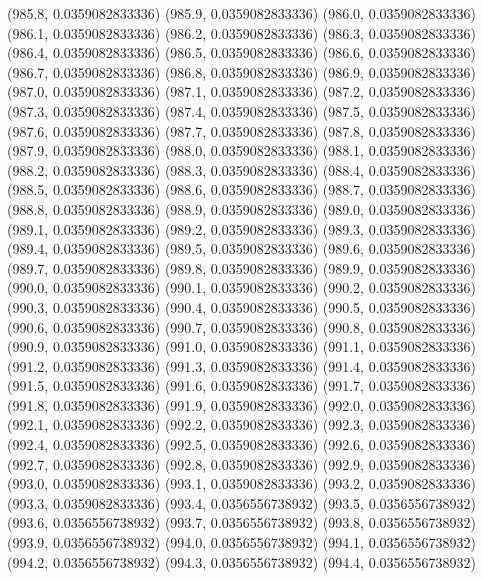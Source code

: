 {					(985.8, 0.0359082833336)
					(985.9, 0.0359082833336)
					(986.0, 0.0359082833336)
					(986.1, 0.0359082833336)
					(986.2, 0.0359082833336)
					(986.3, 0.0359082833336)
					(986.4, 0.0359082833336)
					(986.5, 0.0359082833336)
					(986.6, 0.0359082833336)
					(986.7, 0.0359082833336)
					(986.8, 0.0359082833336)
					(986.9, 0.0359082833336)
					(987.0, 0.0359082833336)
					(987.1, 0.0359082833336)
					(987.2, 0.0359082833336)
					(987.3, 0.0359082833336)
					(987.4, 0.0359082833336)
					(987.5, 0.0359082833336)
					(987.6, 0.0359082833336)
					(987.7, 0.0359082833336)
					(987.8, 0.0359082833336)
					(987.9, 0.0359082833336)
					(988.0, 0.0359082833336)
					(988.1, 0.0359082833336)
					(988.2, 0.0359082833336)
					(988.3, 0.0359082833336)
					(988.4, 0.0359082833336)
					(988.5, 0.0359082833336)
					(988.6, 0.0359082833336)
					(988.7, 0.0359082833336)
					(988.8, 0.0359082833336)
					(988.9, 0.0359082833336)
					(989.0, 0.0359082833336)
					(989.1, 0.0359082833336)
					(989.2, 0.0359082833336)
					(989.3, 0.0359082833336)
					(989.4, 0.0359082833336)
					(989.5, 0.0359082833336)
					(989.6, 0.0359082833336)
					(989.7, 0.0359082833336)
					(989.8, 0.0359082833336)
					(989.9, 0.0359082833336)
					(990.0, 0.0359082833336)
					(990.1, 0.0359082833336)
					(990.2, 0.0359082833336)
					(990.3, 0.0359082833336)
					(990.4, 0.0359082833336)
					(990.5, 0.0359082833336)
					(990.6, 0.0359082833336)
					(990.7, 0.0359082833336)
					(990.8, 0.0359082833336)
					(990.9, 0.0359082833336)
					(991.0, 0.0359082833336)
					(991.1, 0.0359082833336)
					(991.2, 0.0359082833336)
					(991.3, 0.0359082833336)
					(991.4, 0.0359082833336)
					(991.5, 0.0359082833336)
					(991.6, 0.0359082833336)
					(991.7, 0.0359082833336)
					(991.8, 0.0359082833336)
					(991.9, 0.0359082833336)
					(992.0, 0.0359082833336)
					(992.1, 0.0359082833336)
					(992.2, 0.0359082833336)
					(992.3, 0.0359082833336)
					(992.4, 0.0359082833336)
					(992.5, 0.0359082833336)
					(992.6, 0.0359082833336)
					(992.7, 0.0359082833336)
					(992.8, 0.0359082833336)
					(992.9, 0.0359082833336)
					(993.0, 0.0359082833336)
					(993.1, 0.0359082833336)
					(993.2, 0.0359082833336)
					(993.3, 0.0359082833336)
					(993.4, 0.0356556738932)
					(993.5, 0.0356556738932)
					(993.6, 0.0356556738932)
					(993.7, 0.0356556738932)
					(993.8, 0.0356556738932)
					(993.9, 0.0356556738932)
					(994.0, 0.0356556738932)
					(994.1, 0.0356556738932)
					(994.2, 0.0356556738932)
					(994.3, 0.0356556738932)
					(994.4, 0.0356556738932)
}
